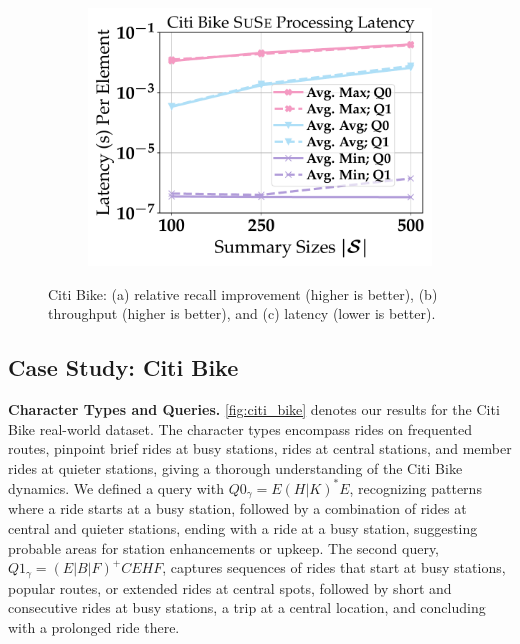 \begin{figure}[t]
	\hfill
	\begin{subfigure}{.32\linewidth}
		\centering
		\includegraphics[width=1.0\linewidth]{revision_plots/CitiBike_latency_lineplot.pdf}
		\vspace{-18pt}
		\caption{}
		\label{plot:citi_bike_latency}
	\end{subfigure}
	\vspace{-1em}
	\caption{Citi Bike: (a) relative recall improvement (higher is better), (b) throughput (higher is better), and (c) latency (lower is better).}
	\label{fig:citi_bike}
	\vspace{-1em}
\end{figure}

\subsection{Case Study: Citi Bike}
\label{subsec:citibike}
\textbf{Character Types and Queries.} \autoref{fig:citi_bike} denotes our
results for the Citi Bike real-world dataset. The character types encompass
rides on frequented routes, pinpoint brief rides at busy stations, rides at
central stations, and member rides at quieter stations, giving a thorough
understanding of the Citi Bike dynamics. We defined a query with $Q0_\gamma =
E(H|K)^*E$, recognizing patterns where a ride starts at a busy station, followed by a combination of rides at central and quieter stations, ending with a ride at a busy station, suggesting probable areas for station enhancements or
upkeep. The second query, $Q1_\gamma = (E|B|F)^+CEHF$, captures sequences of
rides that start at busy stations, popular routes, or extended rides at central
spots, followed by short and consecutive rides at busy stations, a trip at a
central location, and concluding with a prolonged ride there.

